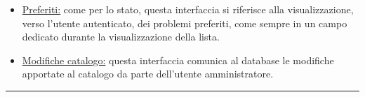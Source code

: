 \documentclass[11pt, a4paper]{article}
\theoremstyle{definition} %
\begin{document}
\begin{description}
\begin{itemize}
        \item \underline{Preferiti:} come per lo stato, questa
        interfaccia si riferisce alla visualizzazione, verso l'utente
        autenticato, dei problemi preferiti, come sempre in un
        campo dedicato durante la visualizzazione della lista.

        \item \underline{Modifiche catalogo:} questa interfaccia
        comunica al database le modifiche apportate al catalogo
        da parte dell'utente amministratore.
    \end{itemize}
\end{description}

\begin{center}
    \rule{5cm}{1pt}
\end{center}
\end{document}
